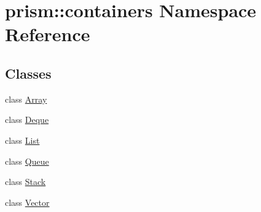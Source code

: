 \hypertarget{namespaceprism_1_1containers}{}\section{prism\+:\+:containers Namespace Reference}
\label{namespaceprism_1_1containers}
\subsection*{Classes}
\begin{DoxyCompactItemize}
\item 
class \hyperlink{classprism_1_1containers_1_1_array}{Array}
\item 
class \hyperlink{classprism_1_1containers_1_1_deque}{Deque}
\item 
class \hyperlink{classprism_1_1containers_1_1_list}{List}
\item 
class \hyperlink{classprism_1_1containers_1_1_queue}{Queue}
\item 
class \hyperlink{classprism_1_1containers_1_1_stack}{Stack}
\item 
class \hyperlink{classprism_1_1containers_1_1_vector}{Vector}
\end{DoxyCompactItemize}
